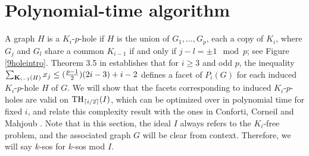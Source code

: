 \section{Polynomial-time algorithm}
A graph $H$ is a $K_i$-$p$-hole if $H$ is the union of $G_1, \ldots, G_p$, each a copy of $K_i$, where $G_j$ and $G_l$ share a common $K_{i-1}$ if and only if $j-l = \pm 1 \mod p$; see Figure \ref{9holeintro}. Theorem 3.5 in \cite{conforti} establishes that for $i \ge 3$ and odd $p$, the inequality $\sum_{\mathbf{K}_{i-1}(H)} x_j \le (\frac{p-1}{2})(2i-3)+i-2$ defines a facet of $P_i(G)$ for each induced $K_i$-$p$-hole $H$ of $G$.
We will show that the facets corresponding to induced $K_i$-$p$-holes are valid
on $\textup{TH}_{\lceil i/2 \rceil}(I)$, which can be optimized over in
polynomial time for fixed $i$, and relate this complexity result with the ones in Conforti, Corneil and Mahjoub \cite{conforti}. Note that in this section, the ideal $I$ always refers to the $K_i$-free problem, and the associated graph $G$ will be clear from context.
Therefore, we will say $k$-sos for $k$-sos mod $I$.

